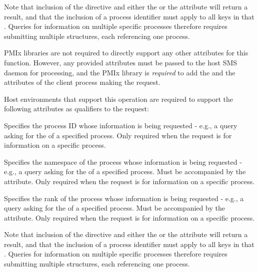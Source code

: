 Note that inclusion of the  directive and either the  or the  attribute will return a  result, and that the inclusion of a process identifier must apply to all keys in that . Queries for information on multiple specific processes therefore requires submitting multiple  structures, each referencing one process.

\ac{PMIx} libraries are not required to directly support any other attributes for this function. However, any provided attributes must be passed to the host \ac{SMS} daemon for processing, and the \ac{PMIx} library is \textit{required} to add the  and the  attributes of the client process making the request.

\divider

Host environments that support this operation are required to support the following attributes as qualifiers to the request:

 Specifies the process ID whose information is being requested - e.g., a query asking for the  of a specified process. Only required when the request is for information on a specific process.
\pastePRIAttributeItemEnd

 Specifies the namespace of the process whose information is being requested - e.g., a query asking for the  of a specified process. Must be accompanied by the  attribute. Only required when the request is for information on a specific process.
\pastePRIAttributeItemEnd

 Specifies the rank of the process whose information is being requested - e.g., a query asking for the  of a specified process. Must be accompanied by the  attribute. Only required when the request is for information on a specific process.
\pastePRIAttributeItemEnd

Note that inclusion of the  directive and either the  or the  attribute will return a  result, and that the inclusion of a process identifier must apply to all keys in that . Queries for information on multiple specific processes therefore requires submitting multiple  structures, each referencing one process.

